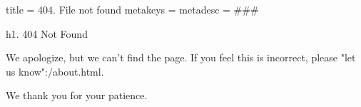 title = 404. File not found
metakeys = 
metadesc =
###

h1. 404 Not Found

We apologize, but we can't find the page. If you feel this is incorrect, please "let us know":/about.html.

We thank you for your patience.

